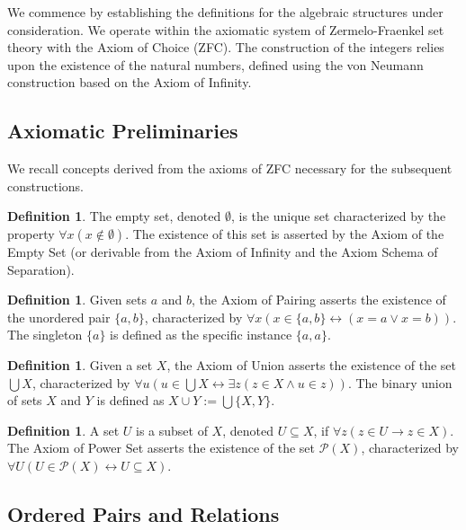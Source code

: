 \documentclass[11pt, a4paper]{article}
\theoremstyle{plain}
\theoremstyle{definition}
\newtheorem{definition}[theorem]{Definition}
\numberwithin{equation}{section}
\newcommand{\powerset}{\mathcal{P}}
\begin{document}
We commence by establishing the definitions for the algebraic structures under consideration. We operate within the axiomatic system of Zermelo-Fraenkel set theory with the Axiom of Choice (ZFC). The construction of the integers relies upon the existence of the natural numbers, defined using the von Neumann construction based on the Axiom of Infinity.

\subsection{Axiomatic Preliminaries}

We recall concepts derived from the axioms of ZFC necessary for the subsequent constructions.

\begin{definition}
The empty set, denoted $\emptyset$, is the unique set characterized by the property $\forall x (x \notin \emptyset)$. The existence of this set is asserted by the Axiom of the Empty Set (or derivable from the Axiom of Infinity and the Axiom Schema of Separation).
\end{definition}

\begin{definition}
Given sets $a$ and $b$, the Axiom of Pairing asserts the existence of the unordered pair $\{a, b\}$, characterized by $\forall x (x \in \{a, b\} \leftrightarrow (x=a \lor x=b))$. The singleton $\{a\}$ is defined as the specific instance $\{a, a\}$.
\end{definition}

\begin{definition}
Given a set $X$, the Axiom of Union asserts the existence of the set $\bigcup X$, characterized by $\forall u (u \in \bigcup X \leftrightarrow \exists z (z \in X \land u \in z))$. The binary union of sets $X$ and $Y$ is defined as $X \cup Y := \bigcup \{X, Y\}$.
\end{definition}

\begin{definition}
A set $U$ is a subset of $X$, denoted $U \subseteq X$, if $\forall z (z \in U \rightarrow z \in X)$. The Axiom of Power Set asserts the existence of the set $\powerset(X)$, characterized by $\forall U (U \in \powerset(X) \leftrightarrow U \subseteq X)$.
\end{definition}

\subsection{Ordered Pairs and Relations}
\end{document}
